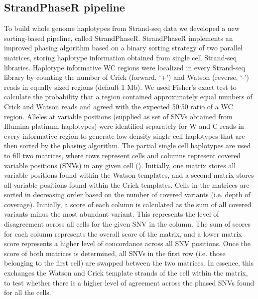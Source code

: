 \subsection{StrandPhaseR pipeline}
	To build whole genome haplotypes from Strand-seq data we developed a new sorting-based pipeline, called StrandPhaseR. 
	StrandPhaseR implements an improved phasing algorithm based on a binary sorting strategy of two parallel matrices, storing haplotype information obtained from single cell Strand-seq libraries. 
	Haplotype informative WC regions were localized in every Strand-seq library  by counting the number of Crick (forward, ‘+’) and Watson (reverse, ‘-’) reads in equally sized regions (default 1 Mb). 
	We used Fisher's exact test to calculate the probability that a region contained approximately equal numbers of Crick and Watson reads and agreed with the expected 50:50 ratio of a WC region. 
	Alleles at variable positions (supplied as set of SNVs obtained from Illumina platinum haplotypes) were identified separately for W and C reads in every informative region to generate low density single cell haplotypes 
	that are then sorted by the phasing algorithm. 
	The partial single cell haplotypes are used to fill two matrices, where rows represent cells and columns represent covered variable positions (SNVs) in any given cell (). 
	Initially, one matrix stores all variable positions found within the Watson templates, and a second matrix stores all variable positions found within the Crick templates. 
	Cells in the matrices are sorted in decreasing order based on the number of covered variants (i.e. depth of coverage). 
	Initially, a score of each column is calculated as the sum of all covered variants minus the most abundant variant. 
	This represents the level of disagreement across all cells for the given SNV in the column. 
	The sum of scores for each column represents the overall score of the matrix, and a lower matrix score represents a higher level of concordance across all SNV positions. 
	Once the score of both matrices is determined, all SNVs in the first row (i.e. those belonging to the first cell) are swapped between the two matrices. 
	In essence, this exchanges the Watson and Crick template strands of the cell within the matrix, to test whether there is a higher level of agreement across the phased SNVs found for all the cells. 

